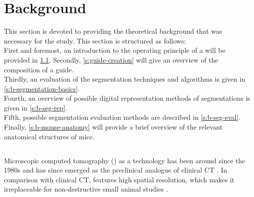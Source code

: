

\chapter{Background}\label{c:background}
This section is devoted to providing the theoretical background that was necessary for the study.
This section is structured as follows:\\
First and foremost, an introduction to the operating principle of a \mct\space will be provided in \cref{s:b-microct}.
Secondly, \cref{s:guide-creation} will give an overview of the composition of a guide.\\
Thirdly, an evaluation of the segmentation techniques and algorithms is given in \cref{s:b-segmentation-basics}.\\
Fourth, an overview of possible digital representation methods of segmentations is given in \cref{s:b-seg-rep}.\\
Fifth, possible segmentation evaluation methods are described in \cref{s:b-seg-eval}.\\
Finally, \cref{s:b-mouse-anatomy} will provide a brief overview of the relevant anatomical structures of mice.


\section{\mct}\label{s:b-microct}
Microscopic computed tomography (\mct) as a technology has been around since the 1980s and has since emerged as the preclinical analogue of clinical CT \cite{clarkAdvancesMicroCTImaging2021,ritmanCurrentStatusDevelopments2011}.
In comparison with clinical CT, \mct\space features high spatial resolution, which makes it irreplaceable for non-destructive small animal studies \cite{clarkAdvancesMicroCTImaging2021,ritmanCurrentStatusDevelopments2011,keklikoglouMicroCTBiologicalBiomedical2021}.


